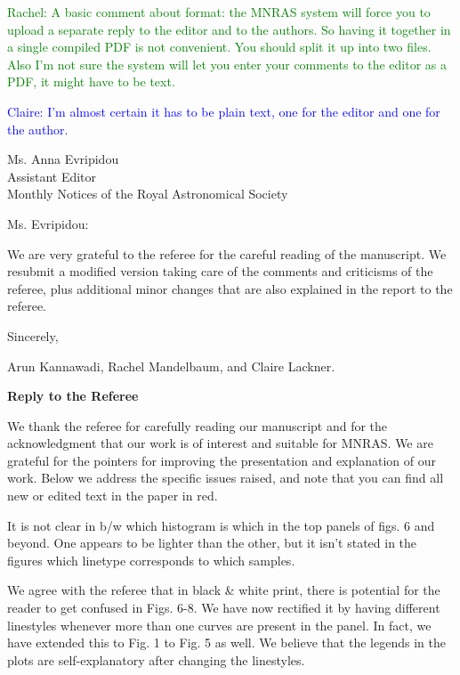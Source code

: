 \documentclass[english]{letter}
\newcommand{\rachel}[1]{\textrm{\textcolor{green}{Rachel: #1}}}
\newcommand{\claire}[1]{\textrm{\textcolor{blue}{Claire: #1}}}
\begin{document}
\date{\today}

\rachel{A basic comment about format: the MNRAS system will force you to upload a separate reply to
  the editor and to the authors.  So having it together in a single compiled PDF is not convenient.
  You should split it up into two files.  Also I'm not sure the system will let you enter your
  comments to the editor as a PDF, it might have to be text.}

\claire{I'm almost certain it has to be plain text, one for the editor and one for the author.}

\begin{letter}{Ms. Anna Evripidou\\ Assistant Editor\\ Monthly Notices of the 
Royal Astronomical Society}

\opening{Ms. Evripidou:}

We are very grateful to the referee for the careful reading of the manuscript.
We resubmit a modified version taking care of the comments and criticisms of the referee, plus
additional minor changes that are also explained in the report to the referee.

\closing{Sincerely,}
Arun Kannawadi, Rachel Mandelbaum, and Claire Lackner.
\end{letter}
\vspace{20pt}
{\bf Reply to the Referee}

We thank the referee for carefully reading our manuscript and for the acknowledgment that our work is of interest
and suitable for MNRAS. We are grateful for the pointers for improving the presentation and
explanation of our work. 
Below we address the specific issues raised, and note that you can find all new or edited text in
the paper in red.

\begin{shaded}
It is not clear in b/w which histogram is which in the top panels of figs. 6 and beyond. One appears to be lighter than the other, but it isn't stated in the figures which linetype corresponds to which samples.
\end{shaded}
\noindent
We agree with the referee that in black \& white print, there is potential for the reader to get confused in Figs. 6-8.
We have now rectified it by having different linestyles whenever more than one curves are present in the panel. In fact, we have extended this to Fig. 1 to Fig. 5 as well. We believe that the legends in the plots are self-explanatory after changing the linestyles.
\end{document}

